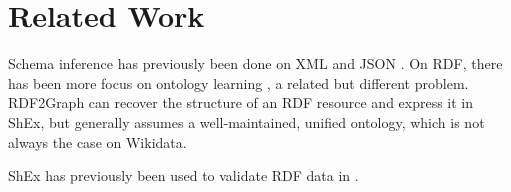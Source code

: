 \documentclass{scrartcl}
\begin{document}
\section{Related Work}

Schema inference has previously been done on XML \cite{Bex:2007:IXS:1325851.1325964} and JSON \cite{json-inference}.
On RDF, there has been more focus on ontology learning \cite{Zhou2007}, a related but different problem.
RDF2Graph \cite{vanDam2015} can recover the structure of an RDF resource and express it in ShEx,
but generally assumes a well-maintained, unified ontology,
which is not always the case on Wikidata.


ShEx has previously been used to validate RDF data in \cite{SOLBRIG201790}.



\end{document}
